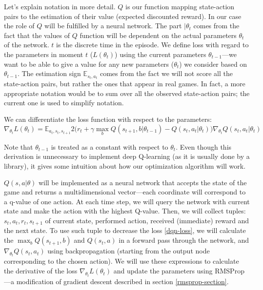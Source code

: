Let's explain notation in more detail. $Q$ is our function mapping state-action pairs to the estimation of their value (expected discounted reward). In our case the role of $Q$ will be fulfilled by a neural network. The part $|\theta_t$ comes from the fact that the values of $Q$ function will be dependent on the actual parameters $\theta_t$ of the network. $t$ is the discrete time in the episode. We define loss with regard to the parameters in moment $t$ ($L(\theta_t)$) using the current parameters $\theta_{t-1}$---we want to be able to give a value for any new parameters ($\theta_t$) we consider based on $\theta_{t-1}$. The estimation sign $\mathbb{E}_{s_t, a_t}$ comes from the fact we will not score all the state-action pairs, but rather the ones that appear in real games. In fact, a more appropriate notation would be to sum over all the observed state-action pairs; the current one is used to simplify notation.

We can differentiate the loss function with respect to the parameters:
\begin{equation}
  \nabla_{\theta_t} L(\theta_t) = \mathbb{E}_{a_t,s_t, s_{t+1}} 2\Big(
  r_t + \gamma \max_b Q(s_{t+1}, b|\theta_{t-1}) - Q(s_t, a_t|\theta_t)\Big)
  \nabla_{\theta_t} Q(s_t, a_t|\theta_t)
\end{equation}

Note that $\theta_{t-1}$ is treated as a constant with respect to $\theta_t$. Even though this derivation is unnecessary to implement deep Q-learning (as it is usually done by a library), it gives some intuition about how our optimization algorithm will work.

$Q(s, a|\theta)$ will be implemented as a neural network that accepts the state of the game and returns a multidimensional vector---each coordinate will correspond to a q-value of one action. At each time step, we will query the network with current state and make the action with the highest Q-value.
Then, we will collect tuples: $s_t, a_t, r_t, s_{t+1}$ of current state, performed action, received (immediate) reward and the next state. To use such tuple to decrease the loss \eqref{dqn-loss}, we will calculate the $\max_b Q(s_{t+1}, b)$ and $Q(s_t, a)$ in a forward pass through the network, and $\nabla_{\theta_t} Q(s_t, a_t)$ using backpropagation (starting from the output node corresponding to the chosen action). We will use these expressions to calculate the derivative of the loss $\nabla_{\theta_t} L(\theta_t)$ and update the parameters using RMSProp---a modification of gradient descent described in section \ref{rmsprop-section}.

